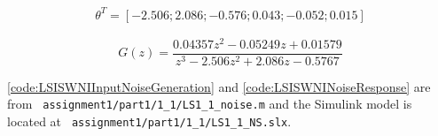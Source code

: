 \begin{equation}
	\begin{gathered}
		\theta^T = [-2.506; 2.086; -0.576; 0.043; -0.052; 0.015]
	\end{gathered}
	\label{eq:LSISWNIThetaNoiseInput}
\end{equation}

\begin{equation}
	G(z) =	\frac{0.04357 z^2 - 0.05249 z + 0.01579}{z^3 - 2.506 z^2 + 2.086 z - 0.5767}
	\label{eq:LSISWNISystemNoiseInput}
\end{equation}

\autoref{code:LSISWNIInputNoiseGeneration} and \autoref{code:LSISWNINoiseResponse} are from \hspace{-1ex}\lstinline| assignment1/part1/1_1/LS1_1_noise.m| and the Simulink model is located at \hspace{-1ex}\lstinline| assignment1/part1/1_1/LS1_1_NS.slx|.
